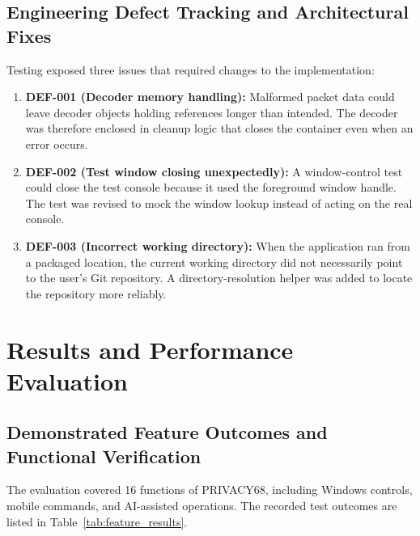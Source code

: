 \documentclass[12pt,letterpaper,oneside]{report}
\begin{document}
\section{Engineering Defect Tracking and Architectural Fixes}
Testing exposed three issues that required changes to the implementation:
\begin{enumerate}
    \item \textbf{DEF-001 (Decoder memory handling):} Malformed packet data could leave decoder objects holding references longer than intended. The decoder was therefore enclosed in cleanup logic that closes the container even when an error occurs.
    \item \textbf{DEF-002 (Test window closing unexpectedly):} A window-control test could close the test console because it used the foreground window handle. The test was revised to mock the window lookup instead of acting on the real console.
    \item \textbf{DEF-003 (Incorrect working directory):} When the application ran from a packaged location, the current working directory did not necessarily point to the user's Git repository. A directory-resolution helper was added to locate the repository more reliably.
\end{enumerate}

\chapter{Results and Performance Evaluation}
\section{Demonstrated Feature Outcomes and Functional Verification}
The evaluation covered 16 functions of PRIVACY68, including Windows controls, mobile commands, and AI-assisted operations. The recorded test outcomes are listed in Table~\ref{tab:feature_results}.
\end{document}
